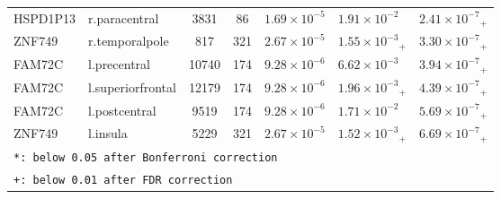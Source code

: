 \begin{tabular}{llcclll}
  HSPD1P13 & r.paracentral & 3831 &   86 & $1.69 \times {10^{-5}}$ & $1.91 \times {10^{-2}}$ & $2.41 \times {10^{-7}}{_+}$ \\ 
  ZNF749 & r.temporalpole &  817 &  321 & $2.67 \times {10^{-5}}$ & $1.55 \times {10^{-3}}{_+}$ & $3.30 \times {10^{-7}}{_+}$ \\ 
  FAM72C & l.precentral & 10740 &  174 & $9.28 \times {10^{-6}}$ & $6.62 \times {10^{-3}}$ & $3.94 \times {10^{-7}}{_+}$ \\ 
  FAM72C & l.superiorfrontal & 12179 &  174 & $9.28 \times {10^{-6}}$ & $1.96 \times {10^{-3}}{_+}$ & $4.39 \times {10^{-7}}{_+}$ \\ 
  FAM72C & l.postcentral & 9519 &  174 & $9.28 \times {10^{-6}}$ & $1.71 \times {10^{-2}}$ & $5.69 \times {10^{-7}}{_+}$ \\ 
  ZNF749 & l.insula & 5229 &  321 & $2.67 \times {10^{-5}}$ & $1.52 \times {10^{-3}}{_+}$ & $6.69 \times {10^{-7}}{_+}$ \\ 
   \hline
    \multicolumn{7}{l}{\texttt{*: below 0.05 after Bonferroni correction}} \\ 

    \multicolumn{7}{l}{\texttt{+: below 0.01 after FDR correction}}        \\ \hline
\end{tabular}
